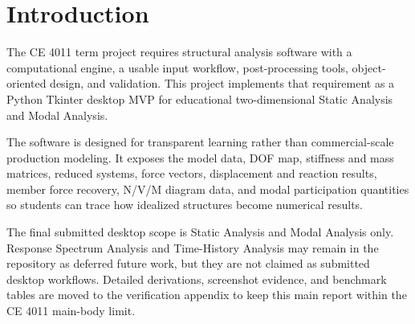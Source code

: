 \section{Introduction}

The CE 4011 term project requires structural analysis software with a computational engine, a usable input workflow, post-processing tools, object-oriented design, and validation. This project implements that requirement as a Python Tkinter desktop MVP for educational two-dimensional Static Analysis and Modal Analysis.

The software is designed for transparent learning rather than commercial-scale production modeling. It exposes the model data, DOF map, stiffness and mass matrices, reduced systems, force vectors, displacement and reaction results, member force recovery, N/V/M diagram data, and modal participation quantities so students can trace how idealized structures become numerical results.


The final submitted desktop scope is Static Analysis and Modal Analysis only. Response Spectrum Analysis and Time-History Analysis may remain in the repository as deferred future work, but they are not claimed as submitted desktop workflows. Detailed derivations, screenshot evidence, and benchmark tables are moved to the verification appendix to keep this main report within the CE 4011 main-body limit.
